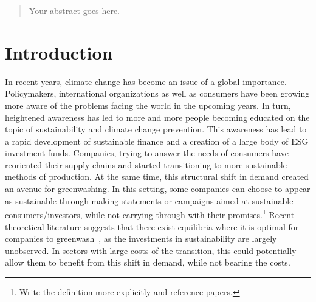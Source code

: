 \documentclass[12pt]{article}
\author{Your Name}
\date{Date of submission: \today}
\begin{document}

\pagebreak

\begin{abstract}
Your abstract goes here.


\end{abstract}
\pagebreak

\tableofcontents
\pagebreak
\listoffigures
\listoftables
\pagebreak

\section{Introduction}\label{sect:introduction}

In recent years, climate change has become an issue of a global importance. Policymakers, international 
organizations as well as consumers have been growing more aware of the problems facing the world in the upcoming years. In turn, heightened awareness has led to more and more people becoming educated on the topic of sustainability and climate change prevention. This awareness has lead to a rapid development of sustainable finance and a creation of a large body of ESG investment funds. Companies, trying to answer the needs of consumers have reoriented their supply chains and started transitioning to more sustainable methods of production. At the same time, this structural shift in demand created an avenue for greenwashing. In this setting, some companies can choose to appear as sustainable through making statements or campaigns aimed at sustainable consumers/investors, while not carrying through with their promises.\footnote{Write the definition more explicitly and reference papers.} Recent theoretical literature suggests that there exist equilibria where it is optimal for companies to greenwash~\parencite{wu_bad_2020, cartellierCanInvestorsCurb2023}, as the investments in sustainability are largely unobserved. In sectors with large costs of the transition, this could potentially allow them to benefit from this shift in demand, while not bearing the costs. 
\end{document}
